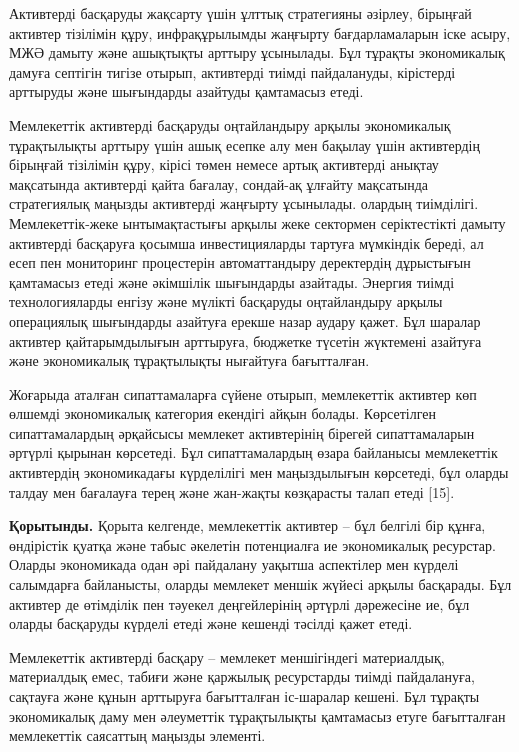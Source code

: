 {Активтерді басқаруды жақсарту үшін ұлттық стратегияны әзірлеу, бірыңғай
активтер тізілімін құру, инфрақұрылымды жаңғырту бағдарламаларын іске
асыру, МЖӘ дамыту және ашықтықты арттыру ұсынылады. Бұл тұрақты
экономикалық дамуға септігін тигізе отырып, активтерді тиімді
пайдалануды, кірістерді арттыруды және шығындарды азайтуды қамтамасыз
етеді.

Мемлекеттік активтерді басқаруды оңтайландыру арқылы экономикалық
тұрақтылықты арттыру үшін ашық есепке алу мен бақылау үшін активтердің
бірыңғай тізілімін құру, кірісі төмен немесе артық активтерді анықтау
мақсатында активтерді қайта бағалау, сондай-ақ ұлғайту мақсатында
стратегиялық маңызды активтерді жаңғырту ұсынылады. олардың тиімділігі.
Мемлекеттік-жеке ынтымақтастығы арқылы жеке сектормен серіктестікті
дамыту активтерді басқаруға қосымша инвестицияларды тартуға мүмкіндік
береді, ал есеп пен мониторинг процестерін автоматтандыру деректердің
дұрыстығын қамтамасыз етеді және әкімшілік шығындарды азайтады. Энергия
тиімді технологияларды енгізу және мүлікті басқаруды оңтайландыру арқылы
операциялық шығындарды азайтуға ерекше назар аудару қажет. Бұл шаралар
активтер қайтарымдылығын арттыруға, бюджетке түсетін жүктемені азайтуға
және экономикалық тұрақтылықты нығайтуға бағытталған.

Жоғарыда аталған сипаттамаларға сүйене отырып, мемлекеттік активтер көп
өлшемді экономикалық категория екендігі айқын болады. Көрсетілген
сипаттамалардың әрқайсысы мемлекет активтерінің бірегей сипаттамаларын
әртүрлі қырынан көрсетеді. Бұл сипаттамалардың өзара байланысы
мемлекеттік активтердің экономикадағы күрделілігі мен маңыздылығын
көрсетеді, бұл оларды талдау мен бағалауға терең және жан-жақты
көзқарасты талап етеді {[}15{]}.

{\bfseries Қорытынды.} Қорыта келгенде, мемлекеттік активтер -- бұл белгілі
бір құнға, өндірістік қуатқа және табыс әкелетін потенциалға ие
экономикалық ресурстар. Оларды экономикада одан әрі пайдалану уақытша
аспектілер мен күрделі салымдарға байланысты, оларды мемлекет меншік
жүйесі арқылы басқарады. Бұл активтер де өтімділік пен тәуекел
деңгейлерінің әртүрлі дәрежесіне ие, бұл оларды басқаруды күрделі етеді
және кешенді тәсілді қажет етеді.

Мемлекеттік активтерді басқару -- мемлекет меншігіндегі материалдық,
материалдық емес, табиғи және қаржылық ресурстарды тиімді пайдалануға,
сақтауға және құнын арттыруға бағытталған іс-шаралар кешені. Бұл тұрақты
экономикалық даму мен әлеуметтік тұрақтылықты қамтамасыз етуге
бағытталған мемлекеттік саясаттың маңызды элементі.

}
